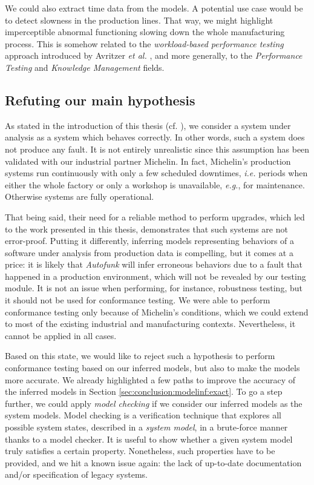 We could also extract time data from the models. A potential use
case would be to detect slowness in the production lines. That
way, we might highlight imperceptible abnormal functioning
slowing down the whole manufacturing process. This is somehow
related to the \emph{workload-based performance testing} approach
introduced by Avritzer \emph{et al.} \cite{avritzer2002software},
and more generally, to the \emph{Performance Testing}
\cite{vokolos1998performance} and \emph{Knowledge Management}
\cite{pachidi2015performance} fields.


\subsection{Refuting our main hypothesis}
\label{sec:conclusion:testing:valid}

As stated in the introduction of this thesis (cf.
), we consider a system
under analysis as a system which behaves correctly. In other
words, such a system does not produce any fault. It is not
entirely unrealistic since this assumption has been validated
with our industrial partner Michelin. In fact, Michelin's
production systems run continuously with only a few scheduled
downtimes, \emph{i.e.} periods when either the whole factory or only a
workshop is unavailable, \emph{e.g.}, for maintenance. Otherwise systems
are fully operational.

That being said, their need for a reliable method to perform
upgrades, which led to the work presented in this thesis,
demonstrates that such systems are not error-proof. Putting it
differently, inferring models representing behaviors of a
software under analysis from production data is compelling, but
it comes at a price: it is likely that \textit{Autofunk} will
infer erroneous behaviors due to a fault that happened in a
production environment, which will not be revealed by our testing
module. It is not an issue when performing, for instance,
robustness testing, but it should not be used for conformance
testing. We were able to perform conformance testing only because
of Michelin's conditions, which we could extend to most of the
existing industrial and manufacturing contexts. Nevertheless, it
cannot be applied in all cases.

Based on this state, we would like to reject such a hypothesis to
perform conformance testing based on our inferred models, but
also to make the models more accurate. We already highlighted a
few paths to improve the accuracy of the inferred models in
Section \ref{sec:conclusion:modelinf:exact}. To go a step
further, we could apply \emph{model checking}
\cite{baier2008principles} if we consider our inferred models as
the system models. Model checking is a verification technique
that explores all possible system states, described in a
\textit{system model}, in a brute-force manner thanks to a model
checker. It is useful to show whether a given system model truly
satisfies a certain property.  Nonetheless, such properties have
to be provided, and we hit a known issue again: the lack of
up-to-date documentation and/or specification of legacy systems.
